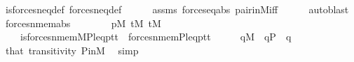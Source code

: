 \begin{isabellebody}
\ is{\isacharunderscore}{\kern0pt}forces{\isacharunderscore}{\kern0pt}neq{\isacharprime}{\kern0pt}{\isacharunderscore}{\kern0pt}def\ forces{\isacharunderscore}{\kern0pt}neq{\isacharprime}{\kern0pt}{\isacharunderscore}{\kern0pt}def\isanewline
\ \ \ \ \isamarkupfalse%
\ assms\ forces{\isacharunderscore}{\kern0pt}eq{\isacharprime}{\kern0pt}{\isacharunderscore}{\kern0pt}abs\ pair{\isacharunderscore}{\kern0pt}in{\isacharunderscore}{\kern0pt}M{\isacharunderscore}{\kern0pt}iff\isanewline
\ \ \ \ \isamarkupfalse%
\ {\isacharparenleft}{\kern0pt}auto{\isacharcomma}{\kern0pt}blast{\isacharparenright}{\kern0pt}\isanewline
{}\isamarkupfalse%
%
\endisatagproof
{\isafoldproof}%
%
\isadelimproof
\isanewline
%
\endisadelimproof
\isanewline
\isanewline
{}\isamarkupfalse%
\ forces{\isacharunderscore}{\kern0pt}nmem{\isacharprime}{\kern0pt}{\isacharunderscore}{\kern0pt}abs\ {\isacharcolon}{\kern0pt}\isanewline
\ \ \isanewline
\ \ \ \ {\isachardoublequoteopen}p{\isasymin}M{\isachardoublequoteclose}\ {\isachardoublequoteopen}t{}{\isasymin}M{\isachardoublequoteclose}\ {\isachardoublequoteopen}t{}{\isasymin}M{\isachardoublequoteclose}\isanewline
\ \ \isanewline
\ \ \ \ {\isachardoublequoteopen}is{\isacharunderscore}{\kern0pt}forces{\isacharunderscore}{\kern0pt}nmem{\isacharprime}{\kern0pt}{\isacharparenleft}{\kern0pt}{\isacharhash}{\kern0pt}{\isacharhash}{\kern0pt}M{\isacharcomma}{\kern0pt}P{\isacharcomma}{\kern0pt}leq{\isacharcomma}{\kern0pt}p{\isacharcomma}{\kern0pt}t{}{\isacharcomma}{\kern0pt}t{}{\isacharparenright}{\kern0pt}\ {\isasymlongleftrightarrow}\ forces{\isacharunderscore}{\kern0pt}nmem{\isacharprime}{\kern0pt}{\isacharparenleft}{\kern0pt}P{\isacharcomma}{\kern0pt}leq{\isacharcomma}{\kern0pt}p{\isacharcomma}{\kern0pt}t{}{\isacharcomma}{\kern0pt}t{}{\isacharparenright}{\kern0pt}{\isachardoublequoteclose}\isanewline
%
\isadelimproof
%
\endisadelimproof
%
\isatagproof
{}\isamarkupfalse%
\ {\isacharminus}{\kern0pt}\isanewline
\ \ \isamarkupfalse%
\ {\isachardoublequoteopen}q{\isasymin}M{\isachardoublequoteclose}\ \ {\isachardoublequoteopen}q{\isasymin}P{\isachardoublequoteclose}\ \ q\isanewline
\ \ \ \ \isamarkupfalse%
\ that\ transitivity\ P{\isacharunderscore}{\kern0pt}in{\isacharunderscore}{\kern0pt}M\ \isamarkupfalse%
\ simp\isanewline
\ \ \isamarkupfalse%
\ \isamarkupfalse%

\end{isabellebody}
